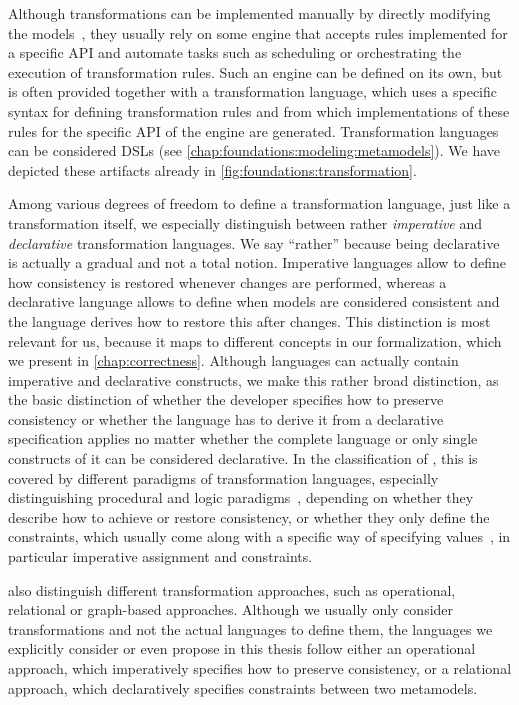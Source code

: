 Although transformations can be implemented manually by directly modifying the models~\cite[p.~16]{czarnecki2006a}, they usually rely on some engine that accepts rules implemented for a specific \gls{API} and automate tasks such as scheduling or orchestrating the execution of transformation rules.
Such an engine can be defined on its own, but is often provided together with a transformation language, which uses a specific syntax for defining transformation rules and from which implementations of these rules for the specific \gls{API} of the engine are generated.
Transformation languages can be considered \glspl{DSL} (see \autoref{chap:foundations:modeling:metamodels}).
We have depicted these artifacts already in \autoref{fig:foundations:transformation}.

Among various degrees of freedom to define a transformation language, just like a transformation itself, we especially distinguish between rather \emph{imperative} and \emph{declarative} transformation languages.
We say \enquote{rather} because being declarative is actually a gradual and not a total notion.
Imperative languages allow to define how consistency is restored whenever changes are performed, whereas a declarative language allows to define when models are considered consistent and the language derives how to restore this after changes.
This distinction is most relevant for us, because it maps to different concepts in our formalization, which we present in \autoref{chap:correctness}.
Although languages can actually contain imperative and declarative constructs, we make this rather broad distinction, as the basic distinction of whether the developer specifies how to preserve consistency or whether the language has to derive it from a declarative specification applies no matter whether the complete language or only single constructs of it can be considered declarative.
In the classification of \textcite{czarnecki2006a}, this is covered by different paradigms of transformation languages, especially distinguishing procedural and logic paradigms~\cite[Fig.~20]{czarnecki2006a}, depending on whether they describe how to achieve or restore consistency, or whether they only define the constraints, which usually come along with a specific way of specifying values~\cite[Fig.~20]{czarnecki2006a}, in particular imperative assignment and constraints.

\textcite{czarnecki2006a} also distinguish different transformation approaches, such as operational, relational or graph-based approaches.
Although we usually only consider transformations and not the actual languages to define them, the languages we explicitly consider or even propose in this thesis follow either an operational approach, which imperatively specifies how to preserve consistency, or a relational approach, which declaratively specifies constraints between two metamodels.

